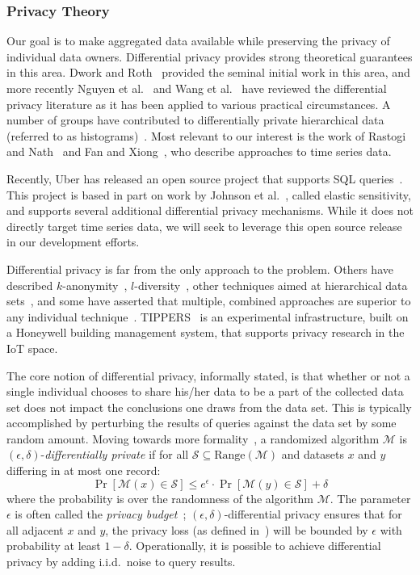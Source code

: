 \subsubsection{Privacy Theory}

Our goal is to make aggregated data available while preserving the
privacy of individual data owners.  Differential privacy
provides strong theoretical guarantees in this area.  Dwork and
Roth~\cite{dwork11,dr14} provided the seminal initial work in this
area, and more recently Nguyen et al.~\cite{nkk13} and
Wang et al.~\cite{wll15} have reviewed the differential
privacy literature as it has been applied to various practical circumstances.
A number of groups have contributed to differentially private hierarchical data
(referred to as histograms)~\cite{hrms10,xxy10}.
Most relevant to our interest is the work of
Rastogi and Nath~\cite{rn10} and
Fan and Xiong~\cite{fx12,fx14}, who describe approaches to time series data.

Recently, Uber has released an open source project that supports
SQL queries~\cite{uber2,Near18,uber}.  This project is based in part
on work by Johnson et al.~\cite{jns18}, called elastic sensitivity, and
supports several additional differential privacy mechanisms.
While it does not directly target time series data, we will
seek to leverage this open source release in our development efforts.

Differential privacy is far from the only approach to the problem.
Others have described $k$-anonymity~\cite{samarati01,sweeney02},
$l$-diversity~\cite{mkgv07},
other techniques aimed at hierarchical data sets~\cite{lnpr14}, and some
have asserted that multiple, combined approaches are superior to any
individual technique~\cite{ct13}.
TIPPERS~\cite{tippers} is an experimental infrastructure, built on a
Honeywell building management system, that supports privacy research
in the IoT space.

The core notion of differential privacy, informally stated, is that whether
or not a single individual chooses to share his/her data to be a part of
the collected data set does not impact the conclusions one draws from
the data set.
This is typically accomplished by perturbing the results of queries
against the data set by some random amount.
Moving towards more formality~\cite{dr14}, a randomized algorithm $\mathcal{M}$
is $(\epsilon,\delta)$-\emph{differentially private} if for all
$\mathcal{S} \subseteq \mbox{Range}(\mathcal{M})$ and datasets $x$ and $y$
differing in at most one record:
\begin{equation}
\Pr[\mathcal{M}(x) \in \mathcal{S}] \leq e^\epsilon \cdot \Pr[\mathcal{M}(y)
\in \mathcal{S}] + \delta
\label{eqn:dp}
\end{equation}
where the probability is over the randomness of the algorithm $\mathcal{M}$.
The parameter $\epsilon$ is often called the
\emph{privacy budget}~\cite{McSherry09}; $(\epsilon,\delta)$-differential
privacy ensures that for all adjacent $x$ and $y$, the privacy loss
(as defined in~\cite{dr14}) will
be bounded by $\epsilon$ with probability at least $1-\delta$.
Operationally, it is possible to achieve differential privacy by adding
i.i.d.~noise to query results.

